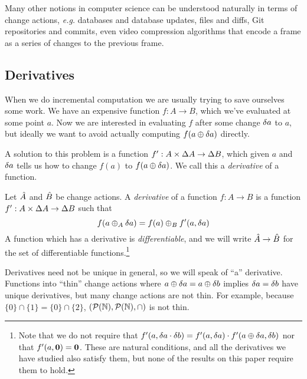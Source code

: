 Many other notions in computer science can be understood naturally in terms of change actions,
\emph{e.g.} databases and database updates, files and diffs, Git repositories and commits, even 
video compression algorithms that encode a frame as a series of changes to the previous frame.

\subsection{Derivatives}

When we do incremental computation we are usually trying to save ourselves some
work. We have an expensive function $f: A \rightarrow B$, which we've evaluated at some point
$a$. Now we are interested in evaluating $f$ after some change $\delta a$ to
$a$, but ideally we want to avoid actually computing $f(a \oplus
\delta a)$ directly.

A solution to this problem is a function $f': A \times \Delta A
\rightarrow \Delta B$, which given $a$ and $\delta a$ tells us how to change
$f(a)$ to $f(a \oplus \delta a)$. We call this a \emph{derivative} of a function.

\begin{defn}
  \label{def:derivative}
  Let $\hat{A}$ and $\hat{B}$ be change actions.
  A \emph{derivative} of a function $f: A \rightarrow B$ is a function $f': A \times \Delta A \rightarrow
  \Delta B$ such that
  \begin{displaymath}
    f(a \oplus_A \delta a) = f(a) \oplus_B f'(a, \delta a)
  \end{displaymath}
  A function which has a derivative is 
  \emph{differentiable}, and we will write $\hat{A} \rightarrow \hat{B}$ for
  the set of differentiable functions.\footnote{Note that we do not require that $f'(a,
    \delta a \cdot \delta b) = f'(a, \delta a) \cdot f'(a
    \oplus \delta a, \delta b)$ nor that $f'(a, \mathbf{0}) = \mathbf{0}$.
    These are natural conditions, and all the 
    derivatives we have studied also satisfy them, but none of the results on
    this paper require them to hold.}
\end{defn}

Derivatives need not be unique in general, so we will speak of ``a''
derivative. Functions into ``thin'' change
actions \textemdash{} where $a \oplus \delta a = a \oplus \delta b$ implies $\delta a =
\delta b$ \textemdash{} have unique derivatives, but many change actions are not thin.
For example, because $\{0\} \cap \{1\} = \{0\}
\cap \{2\}$, $(\mathcal{P}(\mathbb{N}),\mathcal{P}(\mathbb{N}),\cap)$ is not thin.

